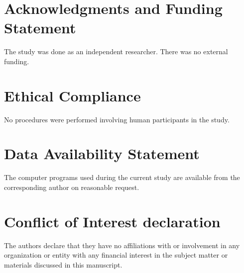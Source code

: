 \documentclass[twoside]{article}
\begin{document}
\section*{Acknowledgments and Funding Statement}

 The study was done as an independent researcher. There was no
external funding.

\section*{Ethical Compliance}

 No procedures were performed  involving human participants in the study.

\section*{Data Availability Statement}

The computer programs used during the current study are
available from the corresponding author on reasonable request.

\section*{Conflict of Interest declaration} 

The authors declare that they have no affiliations with or involvement in any organization 
or entity with any financial interest in the subject matter or materials discussed 
in this manuscript.
\end{document}
